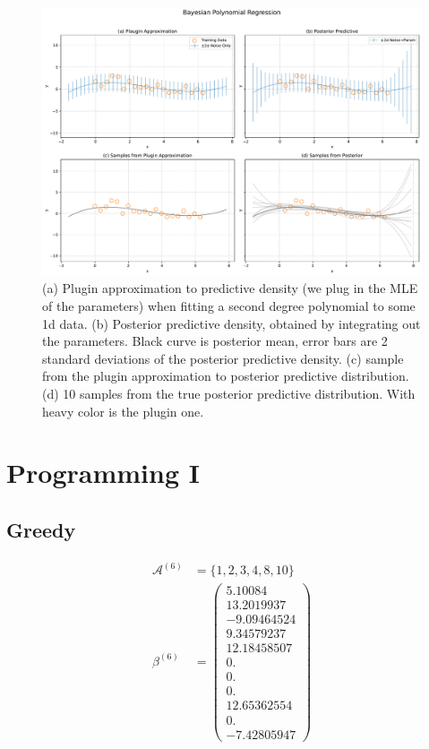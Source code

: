 \documentclass[11pt, a4paper, oneside]{memoir}
\begin{document}
\newpage
\begin{figure}[H]
  \centering
  \includegraphics[width=\textwidth]{code/result/problem9.pdf}
  \caption{(a) Plugin approximation to predictive density (we plug in the MLE of the parameters) when fitting a second degree polynomial to some 1d data.
  (b) Posterior predictive density, obtained by integrating out the parameters. Black curve is posterior mean, error bars are 2 standard deviations of the posterior predictive density.
  (c) sample from the plugin approximation to posterior predictive distribution.
  (d) 10 samples from the true posterior predictive distribution. With heavy color is the plugin one.}
  \label{fig:problem9}
\end{figure}

\chapter{Programming I}
\section{Greedy}
\begin{align*}
  \mathcal{A}^{(6)} &= \{1, 2, 3, 4, 8, 10\} \\
  \beta^{(6)} &= \begin{pmatrix}
    5.10084 \\
    13.2019937 \\
    -9.09464524 \\
    9.34579237 \\
    12.18458507 \\
    0. \\
    0. \\
    0. \\
    12.65362554 \\
    0. \\
    -7.42805947
  \end{pmatrix}
\end{align*}
\end{document}
